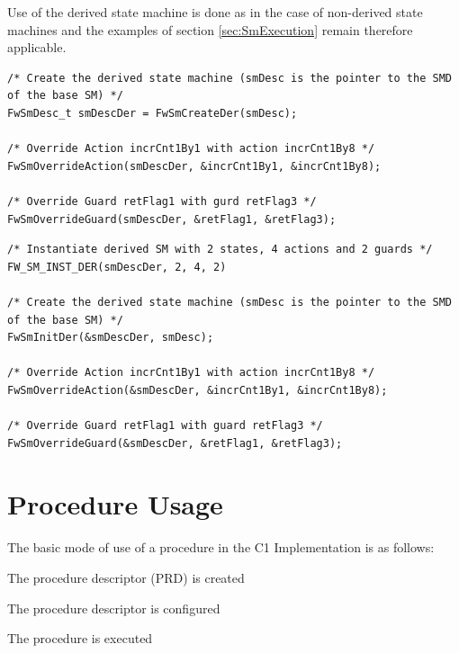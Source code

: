 \documentclass[a4paper,10pt]{article}
\let\stdsection\section
\renewcommand\section{\newpage\stdsection}
\newenvironment{fw_itemize}						%
{\begin{itemize}
  \setlength{\itemsep}{1mm}
  \setlength{\parskip}{0pt}
  \setlength{\parsep}{0pt}}
{\end{itemize}}
\begin{document}
Use of the derived state machine is done as in the case of non-derived state machines and the examples of section \ref{sec:SmExecution} 
remain therefore applicable.


\begin{lstlisting}
/* Create the derived state machine (smDesc is the pointer to the SMD of the base SM) */
FwSmDesc_t smDescDer = FwSmCreateDer(smDesc);

/* Override Action incrCnt1By1 with action incrCnt1By8 */
FwSmOverrideAction(smDescDer, &incrCnt1By1, &incrCnt1By8);

/* Override Guard retFlag1 with gurd retFlag3 */
FwSmOverrideGuard(smDescDer, &retFlag1, &retFlag3);
\end{lstlisting}

\noindent\begin{minipage}{\textwidth}
\begin{lstlisting}
/* Instantiate derived SM with 2 states, 4 actions and 2 guards */
FW_SM_INST_DER(smDescDer, 2, 4, 2)

/* Create the derived state machine (smDesc is the pointer to the SMD of the base SM) */
FwSmInitDer(&smDescDer, smDesc);

/* Override Action incrCnt1By1 with action incrCnt1By8 */
FwSmOverrideAction(&smDescDer, &incrCnt1By1, &incrCnt1By8);

/* Override Guard retFlag1 with guard retFlag3 */
FwSmOverrideGuard(&smDescDer, &retFlag1, &retFlag3);
\end{lstlisting}
\end{minipage}

\section{Procedure Usage}\label{sec:prUsage}

The basic mode of use of a procedure in the C1 Implementation is as follows:

\begin{fw_itemize}
\item The procedure descriptor (PRD) is created
\item The procedure descriptor is configured
\item The procedure is executed
\end{fw_itemize}
\end{document}
